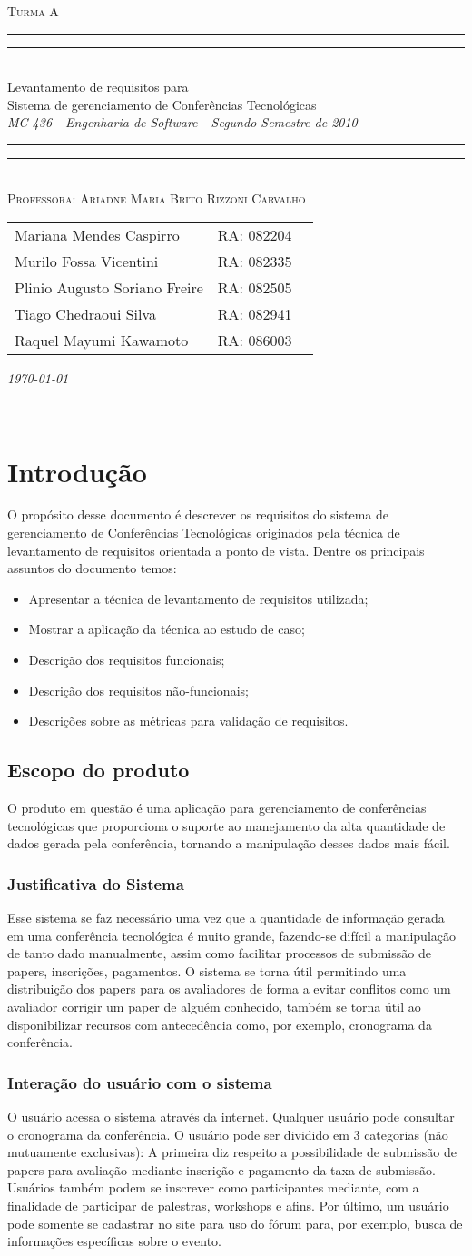 \documentclass[letter]{article}
\newcommand*{\titleTMB}{\begingroup \centering \settowidth{\unitlength}{\LARGE MC 613} \vspace*{\baselineskip} {\large\scshape  Turma A}\\[\baselineskip] \rule{11.0cm}{1.6pt}\vspace*{-\baselineskip}\vspace*{2pt} \rule{11.0cm}{0.4pt}\\[\baselineskip] {\LARGE Levantamento de requisitos para }\\[0.2\baselineskip] {\LARGE Sistema de gerenciamento de Conferências Tecnológicas }\\[0.2\baselineskip] {\itshape MC 436 - Engenharia de Software - Segundo Semestre de 2010}\\[0.2\baselineskip] \rule{11.0cm}{0.4pt}\vspace*{-\baselineskip}\vspace{3.2pt} \rule{11.0cm}{1.6pt}\\[\baselineskip] {\large\scshape Professora: Ariadne Maria Brito Rizzoni Carvalho}\par \vfill {\normalsize   \scshape 
    \begin{center} 
      \begin{tabular}{  l  l  p{5cm} } 
        Mariana Mendes Caspirro & RA: 082204\\
        Murilo Fossa Vicentini & RA: 082335 \\
        Plinio Augusto Soriano Freire & RA:  082505\\
        Tiago Chedraoui Silva  & RA: 082941\\
Raquel Mayumi Kawamoto & RA: 086003 \\    
  \end{tabular} \end{center}
    \itshape \today }\\[\baselineskip] \vspace{3.2pt} \endgroup}
\begin{document}
\titleTMB 
\newpage


\tableofcontents

\newpage

\section{Introdução}
O propósito desse documento é descrever os requisitos do sistema
de gerenciamento de Conferências Tecnológicas
originados pela técnica de levantamento de requisitos orientada a ponto de vista.
Dentre os principais assuntos do documento temos:

\begin{itemize}
\item Apresentar a técnica de levantamento de requisitos utilizada;
\item Mostrar a aplicação da técnica ao estudo de caso;
\item Descrição dos requisitos funcionais;
\item Descrição dos requisitos não-funcionais;
\item Descrições sobre as métricas para validação de requisitos.
\end{itemize}

\subsection{Escopo do produto }

O produto em questão é uma aplicação para gerenciamento de conferências tecnológicas que proporciona o suporte ao manejamento da alta quantidade de dados gerada pela conferência, tornando a manipulação desses dados mais fácil.
\subsubsection{Justificativa do Sistema}

Esse sistema se faz necessário uma vez que a quantidade de informação gerada em uma conferência tecnológica é muito grande, fazendo-se difícil a manipulação de tanto dado manualmente, assim como facilitar processos de submissão de papers, inscrições, pagamentos. O sistema se torna útil permitindo uma distribuição dos papers para os avaliadores de forma a evitar conflitos como um avaliador corrigir um paper de alguém conhecido, também se torna útil ao disponibilizar recursos com antecedência como, por exemplo, cronograma da conferência.


\subsubsection{Interação do usuário com o sistema}
O usuário acessa o sistema através da internet. Qualquer usuário pode consultar o cronograma da conferência. O usuário pode ser dividido em 3 categorias (não mutuamente exclusivas): A primeira diz respeito a possibilidade de submissão de papers para avaliação mediante inscrição e pagamento da taxa de submissão. Usuários também podem se inscrever como participantes mediante, com a finalidade de participar de palestras, workshops e afins. Por último, um usuário pode somente se cadastrar no site para uso do fórum para, por exemplo, busca de informações específicas sobre o evento.
\end{document}
